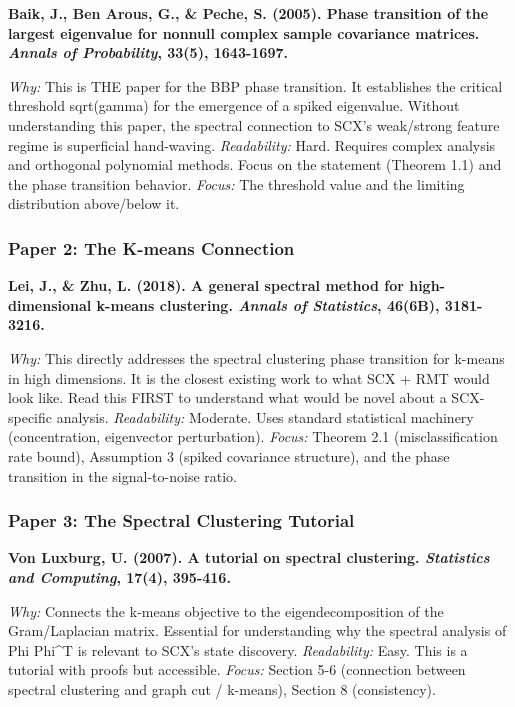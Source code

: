 \documentclass[
  12pt,
]{article}
\begin{document}
\textbf{Baik, J., Ben Arous, G., \& Peche, S. (2005). Phase transition
of the largest eigenvalue for nonnull complex sample covariance
matrices. \emph{Annals of Probability}, 33(5), 1643-1697.}

\emph{Why:} This is THE paper for the BBP phase transition. It
establishes the critical threshold sqrt(gamma) for the emergence of a
spiked eigenvalue. Without understanding this paper, the spectral
connection to SCX's weak/strong feature regime is superficial
hand-waving. \emph{Readability:} Hard. Requires complex analysis and
orthogonal polynomial methods. Focus on the statement (Theorem 1.1) and
the phase transition behavior. \emph{Focus:} The threshold value and the
limiting distribution above/below it.

\subsubsection{Paper 2: The K-means
Connection}\label{paper-2-the-k-means-connection}

\textbf{Lei, J., \& Zhu, L. (2018). A general spectral method for
high-dimensional k-means clustering. \emph{Annals of Statistics},
46(6B), 3181-3216.}

\emph{Why:} This directly addresses the spectral clustering phase
transition for k-means in high dimensions. It is the closest existing
work to what SCX + RMT would look like. Read this FIRST to understand
what would be novel about a SCX-specific analysis. \emph{Readability:}
Moderate. Uses standard statistical machinery (concentration,
eigenvector perturbation). \emph{Focus:} Theorem 2.1 (misclassification
rate bound), Assumption 3 (spiked covariance structure), and the phase
transition in the signal-to-noise ratio.

\subsubsection{Paper 3: The Spectral Clustering
Tutorial}\label{paper-3-the-spectral-clustering-tutorial}

\textbf{Von Luxburg, U. (2007). A tutorial on spectral clustering.
\emph{Statistics and Computing}, 17(4), 395-416.}

\emph{Why:} Connects the k-means objective to the eigendecomposition of
the Gram/Laplacian matrix. Essential for understanding why the spectral
analysis of Phi Phi\^{}T is relevant to SCX's state discovery.
\emph{Readability:} Easy. This is a tutorial with proofs but accessible.
\emph{Focus:} Section 5-6 (connection between spectral clustering and
graph cut / k-means), Section 8 (consistency).
\end{document}
